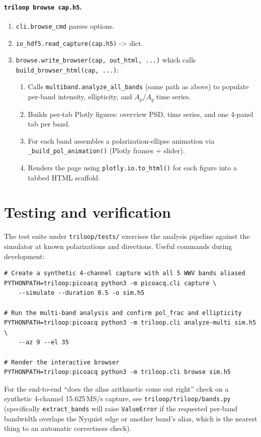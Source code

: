 \documentclass[11pt]{article}
\begin{document}
\paragraph{\texttt{triloop browse cap.h5}.}
\begin{enumerate}\itemsep=2pt
\item \texttt{cli.browse\_cmd} parses options.
\item \texttt{io\_hdf5.read\_capture(cap.h5)} -> dict.
\item \texttt{browse.write\_browser(cap, out\_html, ...)} which calls
      \texttt{build\_browser\_html(cap, ...)}:
\begin{enumerate}\itemsep=1pt
\item Calls \texttt{multiband.analyze\_all\_bands} (same path as
      above) to populate per-band intensity, ellipticity, and
      $A_p / A_q$ time series.
\item Builds per-tab Plotly figures: overview PSD, time series, and
      one 4-panel tab per band.
\item For each band assembles a polarization-ellipse animation via
      \texttt{\_build\_pol\_animation()} (Plotly frames + slider).
\item Renders the page using \texttt{plotly.io.to\_html()} for each
      figure into a tabbed HTML scaffold.
\end{enumerate}
\end{enumerate}

\section{Testing and verification}

The test suite under \texttt{triloop/tests/} exercises the analysis
pipeline against the simulator at known polarizations and directions.
Useful commands during development:

\begin{lstlisting}[style=shell]
# Create a synthetic 4-channel capture with all 5 WWV bands aliased
PYTHONPATH=triloop:picoacq python3 -m picoacq.cli capture \
    --simulate --duration 0.5 -o sim.h5

# Run the multi-band analysis and confirm pol_frac and ellipticity
PYTHONPATH=triloop:picoacq python3 -m triloop.cli analyze-multi sim.h5 \
    --az 9 --el 35

# Render the interactive browser
PYTHONPATH=triloop:picoacq python3 -m triloop.cli browse sim.h5
\end{lstlisting}

For the end-to-end ``does the alias arithmetic come out right'' check
on a synthetic 4-channel 15.625\,MS/s capture, see
\texttt{triloop/triloop/bands.py} (specifically \texttt{extract\_bands}
will raise \texttt{ValueError} if the requested per-band bandwidth
overlaps the Nyquist edge or another band's alias, which is the
nearest thing to an automatic correctness check).
\end{document}
